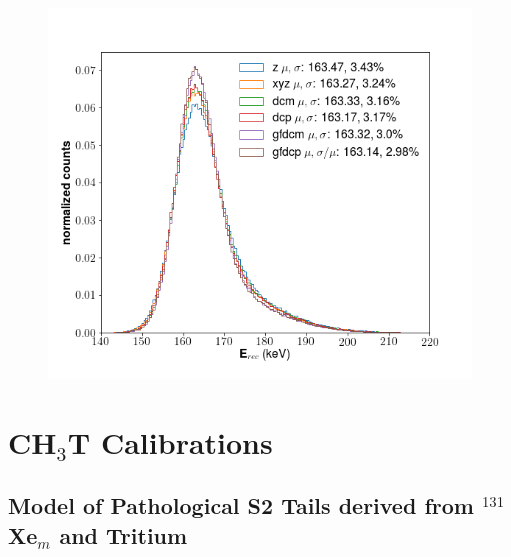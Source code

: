   
\begin{figure}[h!]
  \centering
  \includegraphics[width=\textwidth]{Figures/E_spec_Xe.png}
  \caption{}
\label{fig:E_spec_Xe} 
\end{figure}


\section{CH$_{3}$T Calibrations}


\subsection{Model of Pathological S2 Tails derived from $^{131}$Xe$_{m}$ and Tritium}

